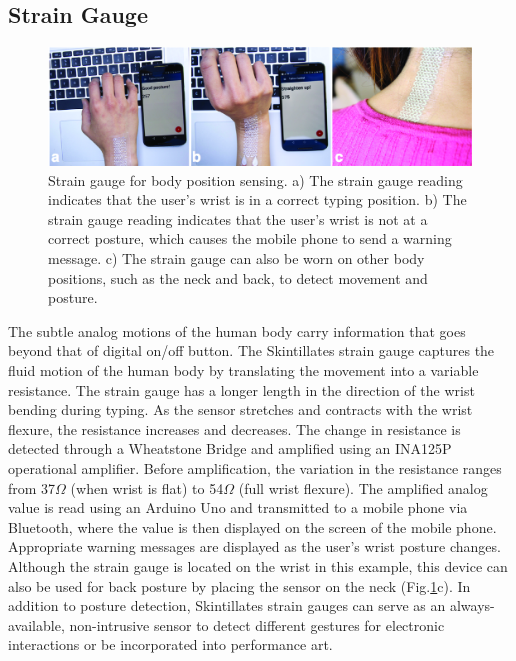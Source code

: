 \documentclass{sigchi}
\begin{document}
\subsection {Strain Gauge}
\begin{figure}
\centering
\includegraphics[width=1.0\textwidth]{figures/Figure10}
\caption{Strain gauge for body position sensing. a) The strain gauge reading indicates that the user's wrist is in a correct typing position. b) The strain gauge reading indicates that the user's wrist is not at a correct posture, which causes the mobile phone to send a warning message. c) The strain gauge can also be worn on other body positions, such as the neck and back, to detect movement and posture.}
\vspace{-8pt}
\label{fig:straingauge}
\end{figure}
The subtle analog motions of the human body carry information that goes beyond that of digital on/off button. The Skintillates strain gauge captures the fluid motion of the human body by translating the movement into a variable resistance. 
 The strain gauge has a longer length in the direction of the wrist bending during typing. As the sensor stretches and contracts with the wrist flexure, the resistance increases and decreases. The change in resistance is detected through a Wheatstone Bridge and amplified using an INA125P operational amplifier. Before amplification, the variation in the resistance ranges from 37$\Omega$ (when wrist is flat) to 54$\Omega$ (full wrist flexure). The amplified analog value is read using an Arduino Uno and transmitted to a mobile phone via Bluetooth, where the value is then displayed on the screen of the mobile phone. Appropriate warning messages are displayed as the user’s wrist posture changes. Although the strain gauge is located on the wrist in this example, this device can also be used for back posture by placing the sensor on the neck (Fig.\ref{fig:straingauge}c). In addition to posture detection, Skintillates strain gauges can serve as an always-available, non-intrusive sensor to detect different gestures for electronic interactions or be incorporated into performance art. 
\end{document}
